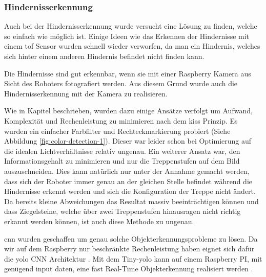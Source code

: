 \subsubsection{Hindernisserkennung}
\label{sec:hindernisserkennung}
Auch bei der Hindernisserkennung wurde versucht eine Lösung zu finden, welche so einfach wie möglich ist.
Einige Ideen wie das Erkennen der Hindernisse mit einem \acrshort{tof} Sensor wurden schnell wieder verworfen,
da man ein Hindernis, welches sich hinter einem anderen Hindernis befindet nicht finden kann.

Die Hindernisse sind gut erkennbar, wenn sie mit einer Raspberry Kamera aus Sicht des Roboters 
fotografiert werden. Aus diesem Grund wurde
auch die Hindernisserkennung mit der Kamera zu realisieren.

Wie in Kapitel  beschrieben, wurden dazu einige Ansätze verfolgt um Aufwand, Komplexität und Rechenleistung zu minimieren nach dem \acrshort{kiss} Prinzip.
Es wurden ein einfacher Farbfilter und Rechteckmarkierung probiert (Siehe Abbildung \ref{fig:color-detection-1}).
Dieser war leider schon bei Optimierung auf die idealen Lichtverhältnisse relativ ungenau.
Ein weiterer Ansatz war, den Informationsgehalt zu minimieren und nur die Treppenstufen auf dem Bild auszuschneiden.
Dies kann natürlich nur unter der Annahme gemacht werden, dass sich der Roboter immer genau an der gleichen Stelle
befindet während die Hindernisse erkennt werden und sich die Konfiguration der Treppe nicht ändert.
Da bereits kleine Abweichungen das Resultat massiv beeinträchtigen können und dass Ziegelsteine, welche
über zwei Treppenstufen hinausragen nicht richtig erkannt werden können, ist auch diese Methode zu ungenau.

\acrfull{cnn} wurden geschaffen um genau solche Objekterkennungsprobleme zu lösen.
Da wir auf dem Raspberry nur beschränkte Rechenleistung haben eignet sich dafür die \acrfull{yolo} CNN 
Architektur \cite{YOLOv3}. Mit dem Tiny-\acrshort{yolo} kann auf einem Raspberry PI, mit genügend input daten, eine
fast Real-Time Objekterkennung realisiert werden \cite{YOLORaspi}.


